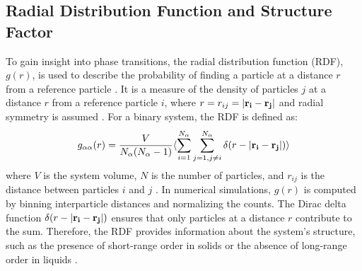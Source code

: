 \documentclass{article}
\begin{document}
\subsection{Radial Distribution Function and Structure Factor}
To gain insight into phase transitions, the radial distribution function (RDF), \(g(r)\), is used to describe the probability of 
finding a particle at a distance \(r\) from a reference particle \cite{allen1989computer}. 
It is a measure of the density of particles \(j\) at a distance \(r\) from a reference particle \(i\),
where \(r=r_{ij} = |\bf{r}_i-\bf{r}_j|\) and radial symmetry is assumed \cite{vollmayr2020introduction}. 
For a binary system, the RDF is defined as:
\begin{equation}\label{eqrdf}
    g_{\alpha\alpha}(r) = \frac{V}{N_{\alpha}(N_\alpha-1)} \langle\sum_{i=1}^{N_\alpha}\sum_{j=1, j\neq i}^{N_\alpha}\delta(r - |\bf{r}_i-\bf{r}_j|)\rangle
\end{equation}
where \(V\) is the system volume, \(N\) is the number of particles, and \(r_{ij}\) is the distance between particles \(i\) and \(j\) \cite{kob1995testing}. 
In numerical simulations, \(g(r)\) is computed by binning interparticle distances and normalizing the counts. 
The Dirac delta function \(\delta(r - |\bf{r}_i-\bf{r}_j|)\) ensures that only particles at a distance \(r\) contribute to the sum. 
Therefore, the RDF provides information about the system’s structure, such as the presence of short-range order in solids or the absence of long-range order in liquids \cite{vollmayr2020introduction}.



\end{document}
